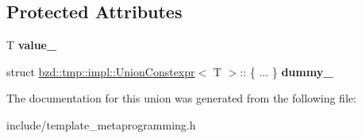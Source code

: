 \subsection*{Protected Attributes}
\begin{DoxyCompactItemize}
\item 
\mbox{\label{unionbzd_1_1tmp_1_1impl_1_1UnionConstexpr_3_01T_01_4_a3038fb8831c3c62a39cf17bb5b255223}} 
T {\bfseries value\+\_\+}
\item 
\mbox{\label{unionbzd_1_1tmp_1_1impl_1_1UnionConstexpr_3_01T_01_4_a91c286094325cba52ad90e62402938f4}} 
struct \hyperlink{unionbzd_1_1tmp_1_1impl_1_1UnionConstexpr}{bzd\+::tmp\+::impl\+::\+Union\+Constexpr}$<$ T $>$\+:: \{ ... \}  {\bfseries dummy\+\_\+}
\end{DoxyCompactItemize}


The documentation for this union was generated from the following file\+:\begin{DoxyCompactItemize}
\item 
include/template\+\_\+metaprogramming.\+h\end{DoxyCompactItemize}
